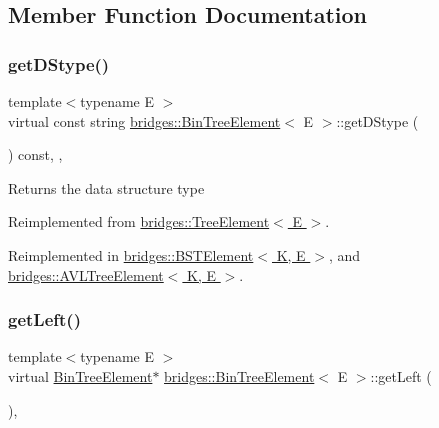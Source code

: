 \subsection{Member Function Documentation}
\hypertarget{classbridges_1_1_bin_tree_element_a0a154f68ef0a58715e598a6ef92b9e59}{}\label{classbridges_1_1_bin_tree_element_a0a154f68ef0a58715e598a6ef92b9e59} 
\subsubsection{\texorpdfstring{get\+D\+Stype()}{getDStype()}}
{\footnotesize\ttfamily template$<$typename E $>$ \\
virtual const string \hyperlink{classbridges_1_1_bin_tree_element}{bridges\+::\+Bin\+Tree\+Element}$<$ E $>$\+::get\+D\+Stype (\begin{DoxyParamCaption}{ }\end{DoxyParamCaption}) const\hspace{0.3cm}{\ttfamily [inline]}, {\ttfamily [override]}, {\ttfamily [virtual]}}

\begin{DoxyReturn}{Returns}
the data structure type 
\end{DoxyReturn}


Reimplemented from \hyperlink{classbridges_1_1_tree_element_a6b264d7391442a742edf96bdd5ee5442}{bridges\+::\+Tree\+Element$<$ E $>$}.



Reimplemented in \hyperlink{classbridges_1_1_b_s_t_element_af3843873c508c24f90b6e73a6f490bf8}{bridges\+::\+B\+S\+T\+Element$<$ K, E $>$}, and \hyperlink{classbridges_1_1_a_v_l_tree_element_a24c005f8e07a7a2682225cead3b7e364}{bridges\+::\+A\+V\+L\+Tree\+Element$<$ K, E $>$}.

\hypertarget{classbridges_1_1_bin_tree_element_a8367ce9c4eea814637edc2c56efbde25}{}\label{classbridges_1_1_bin_tree_element_a8367ce9c4eea814637edc2c56efbde25} 
\subsubsection{\texorpdfstring{get\+Left()}{getLeft()}\hspace{0.1cm}{\footnotesize\ttfamily [1/2]}}
{\footnotesize\ttfamily template$<$typename E $>$ \\
virtual \hyperlink{classbridges_1_1_bin_tree_element}{Bin\+Tree\+Element}$\ast$ \hyperlink{classbridges_1_1_bin_tree_element}{bridges\+::\+Bin\+Tree\+Element}$<$ E $>$\+::get\+Left (\begin{DoxyParamCaption}{ }\end{DoxyParamCaption})\hspace{0.3cm}{\ttfamily [inline]}, {\ttfamily [virtual]}}

